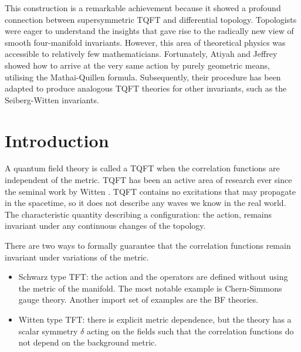 This construction is a remarkable achievement because it showed a profound
connection between supersymmetric TQFT and differential topology. 
Topologists were eager to understand the insights that gave rise to the radically
new view of smooth four-manifold invariants. However, this area of theoretical physics
was accessible to relatively few mathematicians. 
Fortunately, Atiyah and Jeffrey showed how to arrive at the very same action by 
purely geometric means, utilising the Mathai-Quillen formula. 
Subsequently, their procedure has been adapted to produce analogous TQFT
theories for other invariants, such as the Seiberg-Witten invariants.  

\section{Introduction}

A quantum field theory is called a TQFT when the correlation functions are
independent of the metric. 
TQFT has been an active area of research ever since the seminal work by Witten
\cite{wittenTQFT}. TQFT contains no excitations that may propagate in the
spacetime, so it does not describe any waves we know in the real world. The
characteristic quantity describing a configuration: the action, remains
invariant under any continuous changes of the topology. 

There are two ways to formally guarantee that the correlation functions remain
invariant under variations of the metric. %
\begin{itemize}
	\item Schwarz type TFT: the action and the operators are defined without 
		using the metric of the manifold. The most notable example is
		Chern-Simmons gauge theory. Another import set of examples are the BF
		theories. 
	\item Witten type TFT: there is explicit metric
	dependence, but the theory has a scalar symmetry $\delta$ acting on
	the fields such that the correlation
	functions do not depend on the background metric. 
\end{itemize}

